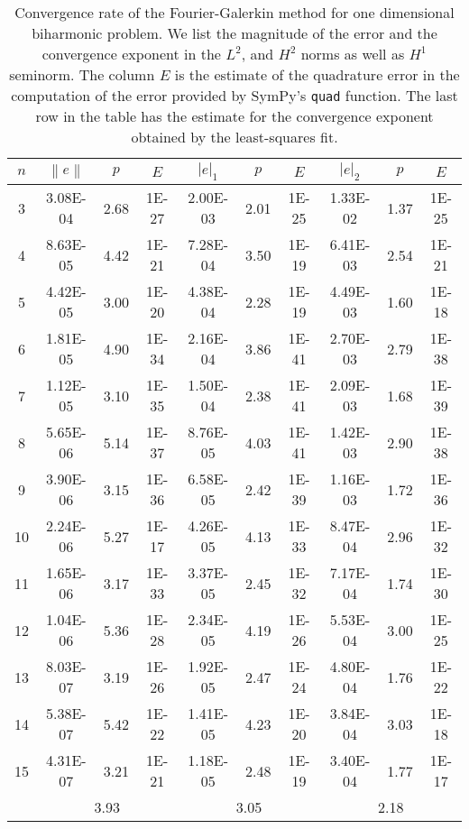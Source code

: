 \documentclass[a4paper,10pt]{article}
\newcommand{\norm}[1]{\ensuremath{\left\|#1\right\|}}
\newcommand{\seminorm}[1]{\ensuremath{\left|#1\right|}}
\begin{document}
  \begin{table}
    \centering
    \begin{tabular}{|c|c|c|c||c|c|c||c|c|c|}
    \hline
    $n$ & $\norm{e}$ & $p$ & $E$ & $\seminorm{e}_1$ & $p$ & $E$ & $\seminorm{e}_2$ & $p$ & $E$\\
\hline
3 & 3.08E-04 & 2.68 & 1E-27 & 2.00E-03 & 2.01 & 1E-25 & 1.33E-02 & 1.37 & 1E-25\\
4 & 8.63E-05 & 4.42 & 1E-21 & 7.28E-04 & 3.50 & 1E-19 & 6.41E-03 & 2.54 & 1E-21\\
5 & 4.42E-05 & 3.00 & 1E-20 & 4.38E-04 & 2.28 & 1E-19 & 4.49E-03 & 1.60 & 1E-18\\
6 & 1.81E-05 & 4.90 & 1E-34 & 2.16E-04 & 3.86 & 1E-41 & 2.70E-03 & 2.79 & 1E-38\\
7 & 1.12E-05 & 3.10 & 1E-35 & 1.50E-04 & 2.38 & 1E-41 & 2.09E-03 & 1.68 & 1E-39\\
8 & 5.65E-06 & 5.14 & 1E-37 & 8.76E-05 & 4.03 & 1E-41 & 1.42E-03 & 2.90 & 1E-38\\
9 & 3.90E-06 & 3.15 & 1E-36 & 6.58E-05 & 2.42 & 1E-39 & 1.16E-03 & 1.72 & 1E-36\\
10 & 2.24E-06 & 5.27 & 1E-17 & 4.26E-05 & 4.13 & 1E-33 & 8.47E-04 & 2.96 & 1E-32\\
11 & 1.65E-06 & 3.17 & 1E-33 & 3.37E-05 & 2.45 & 1E-32 & 7.17E-04 & 1.74 & 1E-30\\
12 & 1.04E-06 & 5.36 & 1E-28 & 2.34E-05 & 4.19 & 1E-26 & 5.53E-04 & 3.00 & 1E-25\\
13 & 8.03E-07 & 3.19 & 1E-26 & 1.92E-05 & 2.47 & 1E-24 & 4.80E-04 & 1.76 & 1E-22\\
14 & 5.38E-07 & 5.42 & 1E-22 & 1.41E-05 & 4.23 & 1E-20 & 3.84E-04 & 3.03 & 1E-18\\
15 & 4.31E-07 & 3.21 & 1E-21 & 1.18E-05 & 2.48 & 1E-19 & 3.40E-04 & 1.77 & 1E-17\\
\hline
    \hline
    & \multicolumn{3}{c||}{3.93} &
      \multicolumn{3}{c||}{3.05} &
      \multicolumn{3}{c|}{2.18}\\
    \hline
    \end{tabular}
    \label{tab:eig_b_1d}
    \caption{Convergence rate of the Fourier-Galerkin method for one dimensional
    biharmonic problem. We list the magnitude of the error and the convergence
    exponent in the $L^2$, and $H^2$ norms as well as $H^1$ seminorm. The column
    $E$ is the estimate of the quadrature error in the computation of the error
    provided by SymPy's {\tt{quad}} function. The last row in the table has the
    estimate for the convergence exponent obtained by the least-squares fit.}
  \end{table}
\end{document}
